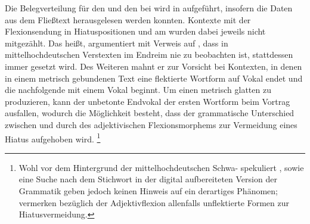 Die Belegverteilung für den  und den  bei
\citet{askedal1973} wird in  aufgeführt, insofern die
Daten aus dem Fließtext herausgelesen werden konnten. Kontexte mit der
Flexionsendung in Hiatuspositionen und am  wurden dabei
jeweils nicht mitgezählt. Das heißt, \citet[89--91]{askedal1973} argumentiert
mit Verweis auf \citet[662--663]{grimm1870}, dass in
mittelhochdeutschen Verstexten im Endreim nie 
zu beobachten ist, stattdessen immer  gesetzt wird. Des Weiteren mahnt
er zur Vorsicht bei Kontexten, in denen in einem metrisch gebundenen Text eine
flektierte Wortform auf Vokal endet und die nachfolgende mit einem Vokal
beginnt. Um einen metrisch glatten  zu produzieren, kann der
unbetonte Endvokal der ersten Wortform beim Vortrag ausfallen, wodurch die
Möglichkeit besteht, dass der grammatische Unterschied zwischen  und
 durch  des adjektivischen Flexionsmorphems zur
Vermeidung eines Hiatus aufgehoben wird.%
%
	\footnote{Wohl vor dem Hintergrund der
		mittelhochdeutschen Schwa-
		\autocites{lindgren1953}[109--111]{paul2007} spekuliert
		\citet[91]{askedal1973},  \citet[27, 109--111,
		203]{paul2007} sowie eine Suche nach dem Stichwort  in
		der digital aufbereiteten Version der Grammatik geben jedoch keinen
		Hinweis auf ein derartiges Phänomen; \citet[244]{ksw2} vermerken
		bezüglich der Adjektivflexion allenfalls
		unflektierte Formen zur Hiatusvermeidung.}
		
